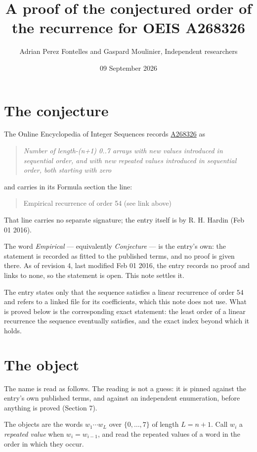 \documentclass[11pt]{article}
\title{A proof of the conjectured order of the recurrence for OEIS A268326}
\author{Adrian Perez Fontelles and Gaspard Moulinier, Independent researchers}
\date{09 September 2026}
\theoremstyle{definition}
\begin{document}
\maketitle
\section{The conjecture}

The Online Encyclopedia of Integer Sequences records \href{https://oeis.org/A268326}{A268326} as

\begin{quote}\itshape Number of length-(n+1) 0..7 arrays with new values introduced in sequential order, and with new repeated values introduced in sequential order, both starting with zero\end{quote}

and carries in its Formula section the line:

\begin{quote}\ttfamily Empirical recurrence of order 54 (see link above)\end{quote}

That line carries no separate signature; the entry itself is by R. H. Hardin (Feb 01 2016).

The word {\itshape Empirical} --- equivalently {\itshape Conjecture} --- is the entry's own: the statement is recorded as fitted to the published terms, and no proof is given there. As of revision 4, last modified Feb 01 2016, the entry records no proof and links to none, so the statement is open. This note settles it.

The entry states only that the sequence satisfies a linear recurrence of order $54$ and refers to a linked file for its coefficients, which this note does not use. What is proved below is the corresponding exact statement: the least order of a linear recurrence the sequence eventually satisfies, and the exact index beyond which it holds.

\section{The object}

The name is read as follows. The reading is not a guess: it is pinned against the entry's own published terms, and against an independent enumeration, before anything is proved (Section 7).

The objects are the words $w_1\cdots w_L$ over $\{0,\dots,7\}$ of length $L = n + 1$. Call $w_i$ a {\itshape repeated value} when $w_i = w_{i-1}$, and read the repeated values of a word in the order in which they occur.
\end{document}
